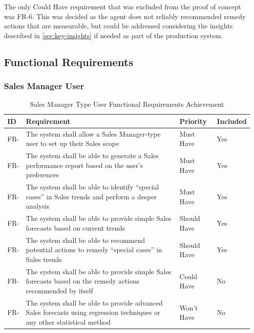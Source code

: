 \documentclass[a4paper]{report}
\begin{document}
The only Could Have requirement that was excluded from the proof of concept was FR-6. This was decided as the agent does not reliably recommended remedy actions that are measurable, but could be addressed considering the insights described in \autoref{sec:key-insights} if needed as part of the production system.


\newcommand{\rfrid}{FR-\arabic{ref-frcounter}}
\newcommand{\rnfrid}{NFR-\arabic{ref-nfrcounter}}

\subsection{Functional Requirements}

\subsubsection{Sales Manager User}

\begin{table}[H]
    \centering
    \begin{tabular}{|l|p{8cm}|l|l|}
        \hline
        \textbf{ID} & \textbf{Requirement} & \textbf{Priority} & \textbf{Included} \\
        \hline
        \stepcounter{ref-frcounter}\rfrid & The system shall allow a Sales Manager-type user to set up their Sales scope & Must Have & Yes \\ \hline
        \stepcounter{ref-frcounter}\rfrid & The system shall be able to generate a Sales performance report based on the user’s preferences & Must Have & Yes \\ \hline
        \stepcounter{ref-frcounter}\rfrid & The system shall be able to identify “special cases” in Sales trends and perform a deeper analysis & Must Have & Yes \\ \hline
        \stepcounter{ref-frcounter}\rfrid & The system shall be able to provide simple Sales forecasts based on current trends & Should Have & Yes \\ \hline
        \stepcounter{ref-frcounter}\rfrid & The system shall be able to recommend potential actions to remedy “special cases” in Sales trends & Should Have & Yes \\ \hline
        \stepcounter{ref-frcounter}\rfrid & The system shall be able to provide simple Sales forecasts based on the remedy actions recommended by itself & Could Have & No \\ \hline
        \stepcounter{ref-frcounter}\rfrid & The system shall be able to provide advanced Sales forecasts using regression techniques or any other statistical method & Won’t Have & No \\
        \hline
    \end{tabular}
\caption{Sales Manager Type User Functional Requirements Achievement}
\end{table}
\end{document}
